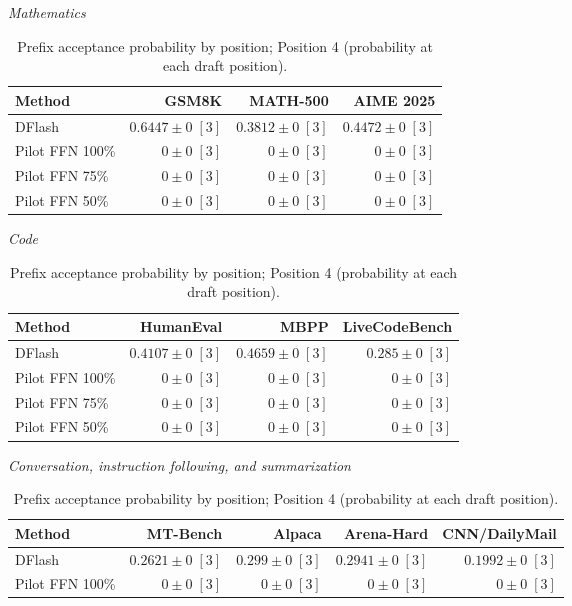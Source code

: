 \documentclass[conference,onecolumn]{IEEEtran}
\begin{document}
\begin{table}[!htp]
\centering\small
\setlength{\tabcolsep}{3pt}
\caption{Prefix acceptance probability by position; Position 4 (probability at each draft position).}
\label{tab:appendix-metric-prefix-survival-4}
\textit{Mathematics}\par\smallskip
\begin{tabular}{@{}>{\raggedright\arraybackslash}p{3.7cm}rrr@{}}
\toprule
Method & GSM8K & MATH-500 & AIME 2025 \\
\midrule
DFlash & \(\mathbf{0.6447} \pm 0\;[3]\) & \(\mathbf{0.3812} \pm 0\;[3]\) & \(\mathbf{0.4472} \pm 0\;[3]\) \\
Pilot FFN 100\% & \(0 \pm 0\;[3]\) & \(0 \pm 0\;[3]\) & \(0 \pm 0\;[3]\) \\
Pilot FFN 75\% & \(0 \pm 0\;[3]\) & \(0 \pm 0\;[3]\) & \(0 \pm 0\;[3]\) \\
Pilot FFN 50\% & \(0 \pm 0\;[3]\) & \(0 \pm 0\;[3]\) & \(0 \pm 0\;[3]\) \\
\bottomrule
\end{tabular}\par\medskip
\textit{Code}\par\smallskip
\begin{tabular}{@{}>{\raggedright\arraybackslash}p{3.7cm}rrr@{}}
\toprule
Method & HumanEval & MBPP & LiveCodeBench \\
\midrule
DFlash & \(\mathbf{0.4107} \pm 0\;[3]\) & \(\mathbf{0.4659} \pm 0\;[3]\) & \(\mathbf{0.285} \pm 0\;[3]\) \\
Pilot FFN 100\% & \(0 \pm 0\;[3]\) & \(0 \pm 0\;[3]\) & \(0 \pm 0\;[3]\) \\
Pilot FFN 75\% & \(0 \pm 0\;[3]\) & \(0 \pm 0\;[3]\) & \(0 \pm 0\;[3]\) \\
Pilot FFN 50\% & \(0 \pm 0\;[3]\) & \(0 \pm 0\;[3]\) & \(0 \pm 0\;[3]\) \\
\bottomrule
\end{tabular}\par\medskip
\textit{Conversation, instruction following, and summarization}\par\smallskip
\begin{tabular}{@{}>{\raggedright\arraybackslash}p{3.7cm}rrrr@{}}
\toprule
Method & MT-Bench & Alpaca & Arena-Hard & CNN/DailyMail \\
\midrule
DFlash & \(\mathbf{0.2621} \pm 0\;[3]\) & \(\mathbf{0.299} \pm 0\;[3]\) & \(\mathbf{0.2941} \pm 0\;[3]\) & \(\mathbf{0.1992} \pm 0\;[3]\) \\
Pilot FFN 100\% & \(0 \pm 0\;[3]\) & \(0 \pm 0\;[3]\) & \(0 \pm 0\;[3]\) & \(0 \pm 0\;[3]\) \\

\end{tabular}
\end{table}
\end{document}
